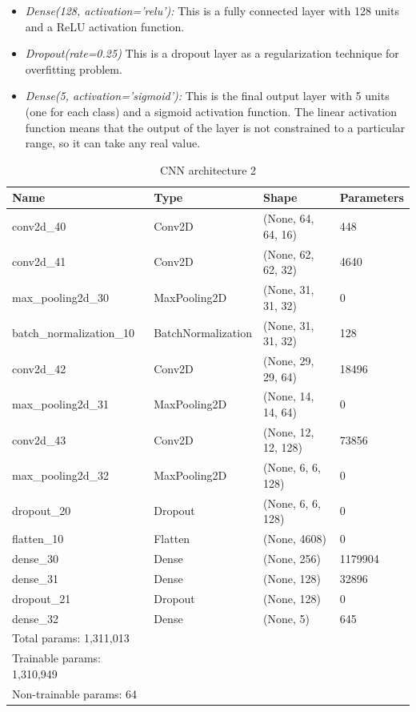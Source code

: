 \begin{itemize}
    \item \textit{Dense(128, activation='relu'):}  This is a fully connected layer with 128 units and a ReLU activation function.
    \item \textit{Dropout(rate=0.25)}  This is a dropout layer as a regularization technique for overfitting problem.
    \item \textit{Dense(5, activation='sigmoid'):} This is the final output layer with 5 units (one for each class) and a sigmoid activation function. The linear activation function means that the output of the layer is not constrained to a particular range, so it can take any real value.
\end{itemize}


\begin{table}[!ht]
    \caption{CNN architecture 2}
    \begin{tabular}{|l|l|l|l|}
    \hline
        Name & Type & Shape & Parameters \\ \hline
        conv2d\_40 & Conv2D & (None, 64, 64, 16) & 448 \\ \hline
        conv2d\_41 & Conv2D & (None, 62, 62, 32) & 4640 \\ \hline
        max\_pooling2d\_30 & MaxPooling2D & (None, 31, 31, 32) & 0 \\ \hline
        batch\_normalization\_10 & BatchNormalization & (None, 31, 31, 32) & 128 \\ \hline
        conv2d\_42 & Conv2D & (None, 29, 29, 64) & 18496 \\ \hline
        max\_pooling2d\_31 & MaxPooling2D & (None, 14, 14, 64) & 0 \\ \hline
        conv2d\_43 & Conv2D & (None, 12, 12, 128) & 73856 \\ \hline
        max\_pooling2d\_32 & MaxPooling2D & (None, 6, 6, 128) & 0 \\ \hline
        dropout\_20 & Dropout & (None, 6, 6, 128) & 0 \\ \hline
        flatten\_10 & Flatten & (None, 4608) & 0 \\ \hline
        dense\_30 & Dense & (None, 256) & 1179904 \\ \hline
        dense\_31 & Dense & (None, 128) & 32896 \\ \hline
        dropout\_21 & Dropout & (None, 128) & 0 \\ \hline
        dense\_32 & Dense & (None, 5) & 645 \\ \hline
        Total params: 1,311,013 & ~ & ~ & ~ \\ \hline
        Trainable params: 1,310,949 & ~ & ~ & ~ \\ \hline
        Non-trainable params: 64 & ~ & ~ & ~\\ \hline
    \end{tabular}
\end{table}

